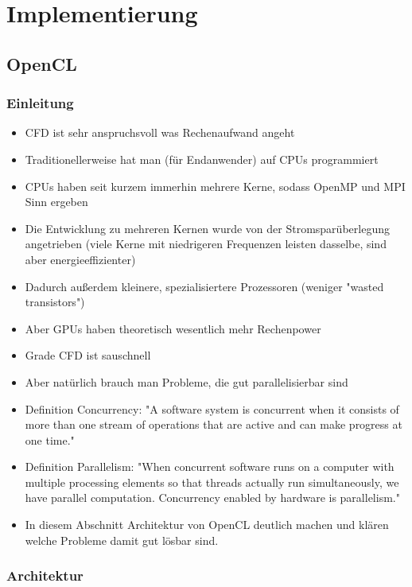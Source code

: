 \section{Implementierung}

\subsection{OpenCL}

\subsubsection{Einleitung}

\begin{itemize}
\item CFD ist sehr anspruchsvoll was Rechenaufwand angeht
\item Traditionellerweise hat man (für Endanwender) auf CPUs programmiert
\item CPUs haben seit kurzem immerhin mehrere Kerne, sodass OpenMP und MPI Sinn ergeben
\item Die Entwicklung zu mehreren Kernen wurde von der Stromsparüberlegung angetrieben (viele Kerne mit niedrigeren Frequenzen leisten dasselbe, sind aber energieeffizienter)
\item Dadurch außerdem kleinere, spezialisiertere Prozessoren (weniger "wasted transistors")
\item Aber GPUs haben theoretisch wesentlich mehr Rechenpower\cite{Guide2012}
\item Grade CFD ist sauschnell
\item Aber natürlich brauch man Probleme, die gut parallelisierbar sind
\item Definition Concurrency: "A software system is concurrent when it consists of more than one stream of operations that are active and can make progress at one time."
\item Definition Parallelism: "When concurrent software runs on a computer with multiple processing elements so that threads actually run simultaneously, we have parallel computation. Concurrency enabled by hardware is parallelism."
\item In diesem Abschnitt Architektur von OpenCL deutlich machen und klären welche Probleme damit gut lösbar sind.
\end{itemize}

\subsubsection{Architektur}

